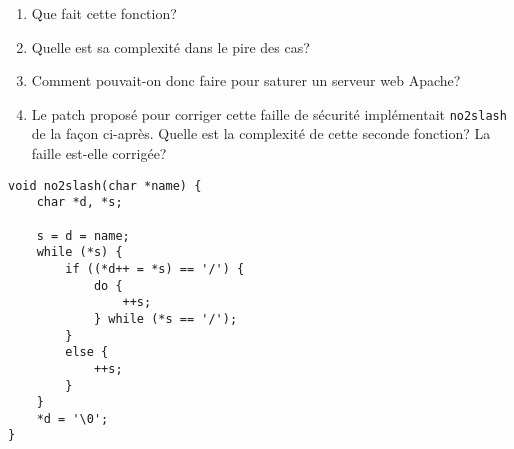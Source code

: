\documentclass[a4paper,10pt]{article}
\begin{document}
\begin{enumerate}
\item Que fait cette fonction?
\item Quelle est sa complexité dans le pire des cas?
\item Comment pouvait-on donc faire pour saturer un serveur web Apache?
\item Le patch proposé pour corriger cette faille de sécurité implémentait
\texttt{no2slash} de la façon ci-après. Quelle est la complexité de cette seconde fonction? La faille est-elle corrigée?
\end{enumerate}

\begin{verbatim}
void no2slash(char *name) {
    char *d, *s;

    s = d = name;
    while (*s) {
        if ((*d++ = *s) == '/') {
            do {
                ++s;
            } while (*s == '/');
        }
        else {
            ++s;
        }
    }
    *d = '\0';
}
\end{verbatim}
\end{document}
